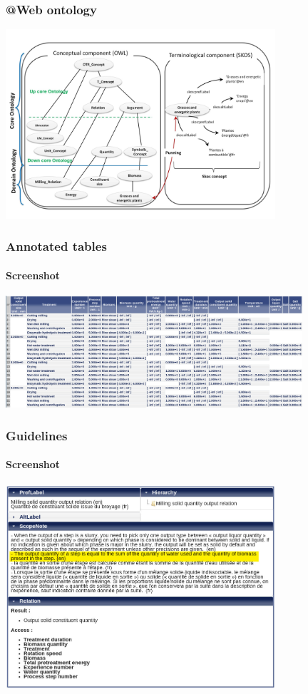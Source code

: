\documentclass{beamer}
\makeatletter
\newcommand{\atweb}{\textbf{@Web}\xspace}
\makeatother
\begin{document}
\begin{frame}
  \frametitle{\atweb ontology}

  \begin{center}
    \includegraphics[width=10cm]{ontology.jpg}
  \end{center}
\end{frame}

\begin{frame}
  \frametitle{Annotated tables}
  \framesubtitle{Screenshot}

  \begin{center}
    \includegraphics[width=11cm]{atweb-screenshot-table.jpg}
  \end{center}
\end{frame}

\begin{frame}
  \frametitle{Guidelines}

  \framesubtitle{Screenshot}

  \begin{center}
    \includegraphics[width=10cm]{atweb-screenshot-guideline.jpg}
  \end{center}
\end{frame}
\end{document}
